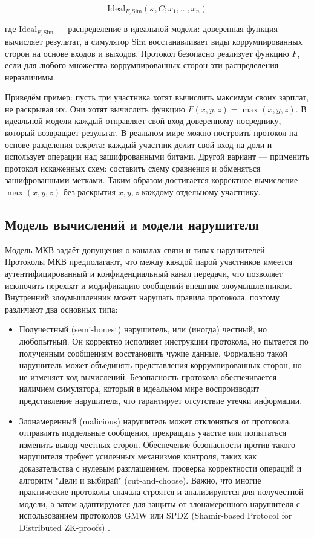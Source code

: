 \begin{equation}
\mathrm{Ideal}_{F,\mathrm{Sim}}(\kappa, C; x_{1},\ldots,x_{n})
\end{equation}

где \(\mathrm{Ideal}_{F,\mathrm{Sim}}\) --- распределение в идеальной модели: доверенная функция вычисляет результат, а симулятор \(\mathrm{Sim}\) восстанавливает виды коррумпированных сторон на основе входов и выходов. Протокол безопасно реализует функцию \(F\), если для любого множества коррумпированных сторон эти распределения неразличимы.

Приведём пример: пусть три участника хотят вычислить максимум своих зарплат, не раскрывая их. Они хотят вычислить функцию \(F(x,y,z)=\max(x,y,z)\). В идеальной модели каждый отправляет свой вход доверенному посреднику, который возвращает результат. В реальном мире можно построить протокол на основе разделения секрета: каждый участник делит свой вход на доли и использует операции над зашифрованными битами. Другой вариант --- применить протокол искаженных схем: составить схему сравнения и обменяться зашифрованными метками. Таким образом достигается корректное вычисление \(\max(x,y,z)\) без раскрытия \(x,y,z\) каждому отдельному участнику.

\subsection{Модель вычислений и модели нарушителя}

Модель МКВ задаёт допущения о каналах связи и типах нарушителей. Протоколы МКВ предполагают, что между каждой парой участников имеется аутентифицированный и конфиденциальный канал передачи, что позволяет исключить перехват и модификацию сообщений внешним злоумышленником. Внутренний злоумышленник может нарушать правила протокола, поэтому различают два основных типа:

\begin{itemize}
\item Получестный (semi-\allowbreak honest) нарушитель, или (иногда) честный, но любопытный. Он корректно исполняет инструкции протокола, но пытается по полученным сообщениям восстановить чужие данные. Формально такой нарушитель может объединять представления коррумпированных сторон, но не изменяет ход вычислений. Безопасность протокола обеспечивается наличием симулятора, который в идеальном мире воспроизводит представление нарушителя, что гарантирует отсутствие утечки информации.

\item Злонамеренный (malicious) нарушитель может отклоняться от протокола, отправлять поддельные сообщения, прекращать участие или попытаться изменить вывод честных сторон. Обеспечение безопасности против такого нарушителя требует усиленных механизмов контроля, таких как доказательства с нулевым разглашением, проверка корректности операций и алгоритм "Дели и выбирай" (cut-and-choose). Важно, что многие практические протоколы сначала строятся и анализируются для получестной модели, а затем адаптируются для защиты от злонамеренного нарушителя с использованием протоколов GMW или SPDZ (Shamir-based Protocol for Distributed ZK-proofs) \cite{06}.
\end{itemize}

